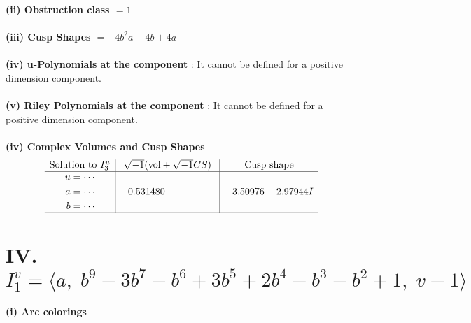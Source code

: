 \documentclass[1p]{elsarticle_modified}
\theoremstyle{definition}
\newcommand{\I}{\sqrt{-1}}
\begin{document}
\flushleft \textbf{(ii) Obstruction class $= 1$}\\~\\
\flushleft \textbf{(iii) Cusp Shapes $= -4 b^2 a-4 b+4 a$}\\~\\
\flushleft \textbf{(iv) u-Polynomials at the component} : It cannot be defined for a positive dimension component.\\~\\
\flushleft \textbf{(v) Riley Polynomials at the component} : It cannot be defined for a positive dimension component.\\~\\
\newpage\flushleft \textbf{(iv) Complex Volumes and Cusp Shapes}
$$\begin{array}{c|c|c} 
\text{Solution to }I^u_{3}& \I (\text{vol} + \sqrt{-1}CS) & \text{Cusp shape}\\
 \hline 
\begin{aligned}
u &= \cdots \\
a &= \cdots \\
b &= \cdots\end{aligned}
 & -0.531480\phantom{ +0.000000I} & -3.50976 - 2.97944 I\\
 \hline 
 \end{array}
$$\newpage\renewcommand{\arraystretch}{1}
\centering \section*{IV. $I^v_{1}= \langle a,\;b^9-3 b^7- b^6+3 b^5+2 b^4- b^3- b^2+1,\;v-1 \rangle$}
\flushleft \textbf{(i) Arc colorings}\\
\end{document}
